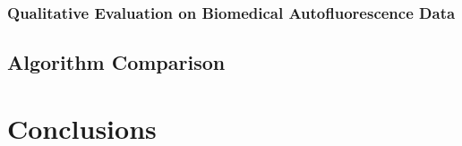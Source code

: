 \documentclass[10pt]{article}
\begin{document}
\subsubsection{Qualitative Evaluation on Biomedical Autofluorescence Data}

\clearpage
\subsection{Algorithm Comparison}

\clearpage
% 
% 
% 
% 
% 

\clearpage
% 
% 
% 
% 
% 
\section{Conclusions}
\end{document}
